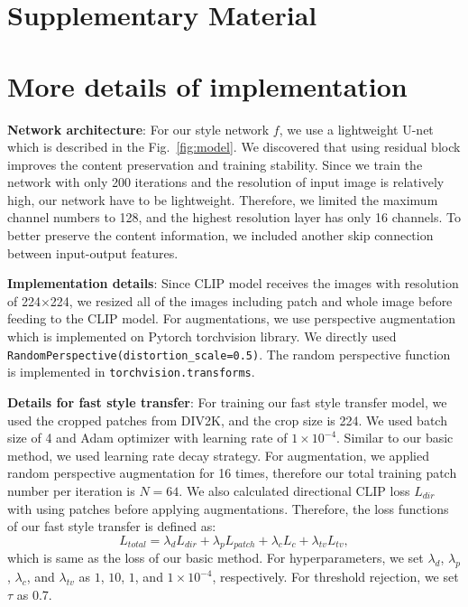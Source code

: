 \documentclass[10pt,twocolumn,letterpaper]{article}
\begin{document}
\appendix




\section*{\Large{\textbf{Supplementary Material}}}
\section{More details of implementation}
\noindent\textbf{Network architecture}: For our style network $f$, we use a lightweight U-net which is described in the Fig.~\ref{fig:model}. We discovered that using residual block improves the content preservation and training stability. Since we train the network with only 200 iterations and the resolution of input image is relatively high, our network have to be lightweight. Therefore, we limited the maximum channel numbers to 128, and the highest resolution layer has only 16 channels. To better preserve the content information, we included another skip connection between input-output features. 

\noindent\textbf{Implementation details}: Since CLIP model receives the images with resolution of 224$\times$224, we resized all of the images including patch and whole image before feeding to the CLIP model. For augmentations, we use perspective augmentation which is implemented on Pytorch torchvision library. We directly used \verb|RandomPerspective(distortion_scale=0.5)|. The random perspective function is implemented in \verb|torchvision.transforms|.

\noindent\textbf{Details for fast style transfer}: For training our fast style transfer model, we used the cropped patches from DIV2K\cite{div2k}, and the crop size is 224. We used batch size of 4 and Adam optimizer with learning rate of $1\times10^{-4}$. Similar to our basic method, we used learning rate decay strategy. For augmentation, we applied random perspective augmentation for 16 times, therefore our total training patch number per iteration is $N=64$. We also calculated directional CLIP loss $L_{dir}$ with using patches before applying augmentations. Therefore, the loss functions of our fast style transfer is defined as:
\begin{equation*}
    L_{total} = \lambda_d L_{dir}+ \lambda_p L_{patch} + \lambda_c L_c + \lambda_{tv} L_{tv},
\end{equation*}
which is same as the loss of our basic method.
For hyperparameters, we set $\lambda_d$, $\lambda_p$, $\lambda_c$, and $\lambda_{tv}$ as $1$, $10$,  $1$, and $1\times10^{-4}$, respectively. For threshold rejection, we set $\tau$ as 0.7.  
\end{document}
